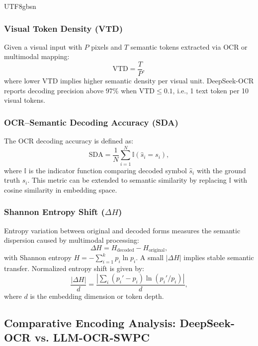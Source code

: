 \documentclass[conference]{IEEEtran}
\begin{document}
\begin{CJK*}{UTF8}{gbsn}
\subsubsection{Visual Token Density (VTD)}

Given a visual input with $P$ pixels and $T$ semantic tokens extracted via OCR or multimodal mapping:
\begin{equation}
\text{VTD} = \frac{T}{P},
\end{equation}
where lower $\text{VTD}$ implies higher semantic density per visual unit.  
DeepSeek-OCR reports decoding precision above 97\% when $\text{VTD} \leq 0.1$, i.e., 1 text token per 10 visual tokens.

\subsubsection{OCR–Semantic Decoding Accuracy (SDA)}

The OCR decoding accuracy is defined as:
\begin{equation}
\text{SDA} = \frac{1}{N} \sum_{i=1}^{N} \mathbb{I}(\hat{s}_i = s_i),
\end{equation}
where $\mathbb{I}$ is the indicator function comparing decoded symbol $\hat{s}_i$ with the ground truth $s_i$.  
This metric can be extended to semantic similarity by replacing $\mathbb{I}$ with cosine similarity in embedding space.

\subsubsection{Shannon Entropy Shift ($\Delta H$)}

Entropy variation between original and decoded forms measures the semantic dispersion caused by multimodal processing:
\begin{equation}
\Delta H = H_{\text{decoded}} - H_{\text{original}},
\end{equation}
with Shannon entropy $H = - \sum_{i=1}^{k} p_i \ln p_i$.  
A small $|\Delta H|$ implies stable semantic transfer.  
Normalized entropy shift is given by:
\begin{equation}
\frac{|\Delta H|}{d} = \frac{|\sum_i (p_i' - p_i)\ln(p_i'/p_i)|}{d},
\end{equation}
where $d$ is the embedding dimension or token depth.

\subsection{Comparative Encoding Analysis: DeepSeek-OCR vs. LLM-OCR-SWPC}


\end{CJK*}
\end{document}
